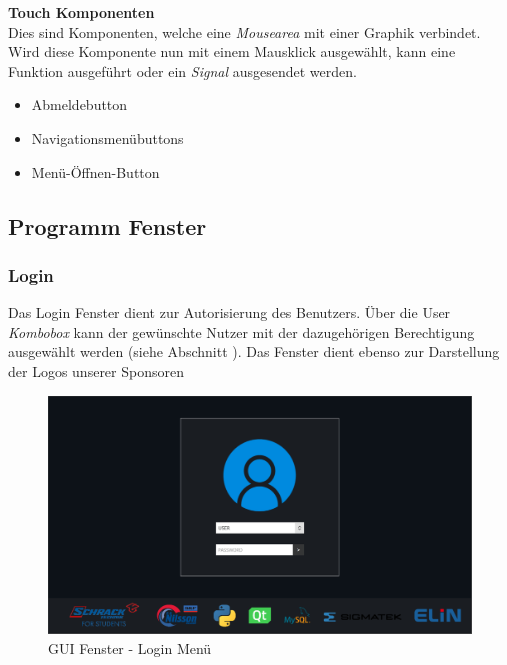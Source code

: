 \textbf{Touch Komponenten}\\
Dies sind Komponenten, welche eine \textit{Mousearea} mit einer Graphik verbindet. Wird diese Komponente nun mit einem Mausklick ausgewählt, kann eine Funktion ausgeführt oder ein \textit{Signal} ausgesendet werden.

\begin{itemize}
	
	\item Abmeldebutton
	\item Navigationsmenübuttons
	\item Menü-Öffnen-Button
	
\end{itemize}

\newpage

\subsection{Programm Fenster}

\subsubsection{Login}

Das Login Fenster dient zur Autorisierung des Benutzers. Über die User \textit{Kombobox} kann der gewünschte Nutzer mit der dazugehörigen Berechtigung ausgewählt werden (siehe Abschnitt ). Das Fenster dient ebenso zur Darstellung der Logos unserer Sponsoren\\

\begin{figure}[H]
	\begin{center}
		\includegraphics[scale=0.25]{figures/hcis/window_login.png}
			\caption{GUI Fenster - Login Menü}
			\label{fig:pageMenu}
	\end{center}
\end{figure}

